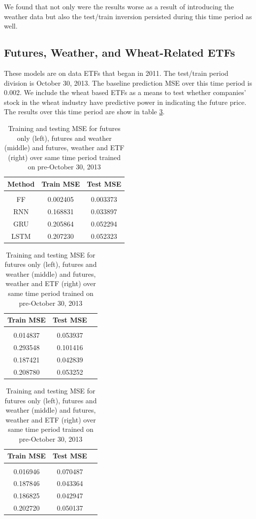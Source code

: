 \documentclass[twoside,11pt]{article}
\begin{document}
We found that not only were the results worse as a result of introducing the weather data but also the test/train inversion persisted during this time period as well.


\subsection{Futures, Weather, and Wheat-Related ETFs}

These models are on data ETFs that began in 2011. The test/train period division is October 30, 2013. The baseline prediction MSE over this time period is 0.002. We include the wheat based ETFs as a means to test whether companies' stock in the wheat industry have predictive power in indicating the future price. The results over this time period are show in table \ref{tab:futuresweatherandetf}.

\begin{table}[h!]
		\begin{tabular}{ccc}
			Method & Train MSE & Test MSE \\
			\hline \\[-11pt]
			FF& 0.002405 & 0.003373 \\
			RNN & 0.168831 & 0.033897 \\ 
			GRU & 0.205864 & 0.052294 \\
			LSTM & 0.207230 & 0.052323 \\
			\hline
		\end{tabular}
		\begin{tabular}{ccc}
			Train MSE & Test MSE \\
			\hline \\[-11pt]
			0.014837 & 0.053937 \\
			0.293548 & 0.101416 \\ 
			0.187421 & 0.042839 \\
			0.208780 & 0.053252 \\
			\hline
		\end{tabular}
			\begin{tabular}{ccc}
		Train MSE & Test MSE \\
		\hline \\[-11pt]
		0.016946 & 0.070487 \\
		0.187846 & 0.043364 \\ 
		0.186825 & 0.042947 \\
		0.202720 & 0.050137 \\
		\hline
	\end{tabular}
		\label{tab:futuresweatherandetf}
		\caption{Training and testing MSE for futures only (left), futures and weather (middle) and futures, weather and ETF (right) over same time period trained on pre-October 30, 2013}
\end{table}
\end{document}
